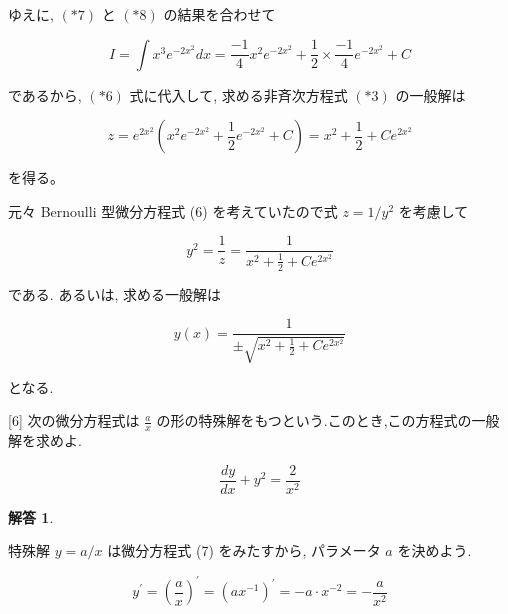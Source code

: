 \documentclass[10pt]{jsarticle}
\newtheorem*{answer*}{解答}
\begin{document}
ゆえに, $(* 7)$ と $(* 8)$ の結果を合わせて

$$
I=\int x^{3} e^{-2 x^{2}} d x=\frac{-1}{4} x^{2} e^{-2 x^{2}}+\frac{1}{2} \times \frac{-1}{4} e^{-2 x^{2}}+C
$$

であるから, $(* 6)$ 式に代入して, 求める非斉次方程式 $(* 3)$ の一般解は


\begin{equation*}
z=e^{2 x^{2}}\left(x^{2} e^{-2 x^{2}}+\frac{1}{2} e^{-2 x^{2}}+C\right)=x^{2}+\frac{1}{2}+C e^{2 x^{2}} \tag{*9}
\end{equation*}


を得る。

元々 Bernoulli 型微分方程式 (6) を考えていたので式 $z=1 / y^{2}$ を考慮して


\begin{equation*}
y^{2}=\frac{1}{z}=\frac{1}{x^{2}+\frac{1}{2}+C e^{2 x^{2}}} \tag{*10}
\end{equation*}


である. あるいは, 求める一般解は


\begin{equation*}
y(x)=\frac{1}{ \pm \sqrt{x^{2}+\frac{1}{2}+C e^{2 x^{2}}}} \tag{*11}
\end{equation*}


となる.

\bigskip
\bigskip
\bigskip
\bigskip
\bigskip
\bigskip
\bigskip
\bigskip
\bigskip
\bigskip
\bigskip
\bigskip
\bigskip
\bigskip

\begin{itembox}[l]{[6]}
次の微分方程式は $\frac{a}{x}$ の形の特殊解をもつという.このとき,この方程式の一般解を求めよ.

\begin{equation*}
\frac{d y}{d x}+y^{2}=\frac{2}{x^{2}} \tag{7}
\end{equation*}
\end{itembox}





\bigskip

\begin{answer*}
\end{answer*}

特殊解 $y=a / x$ は微分方程式 (7) をみたすから, パラメータ $a$ を決めよう.


\begin{equation*}
y^{\prime}=\left(\frac{a}{x}\right)^{\prime}=\left(a x^{-1}\right)^{\prime}=-a \cdot x^{-2}=-\frac{a}{x^{2}} \tag{*1}
\end{equation*}
\end{document}
